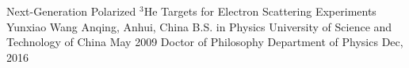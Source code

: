 \documentclass[pdftex,letterpaper,12pt]{report}
\begin{document}
	

\thesistitle
{Next-Generation Polarized $^3$He Targets for Electron Scattering Experiments}                                                %
{Yunxiao Wang}                                               %
{Anqing, Anhui, China}                               %
{B.S. in Physics University of Science and Technology of China May 2009} %
{Doctor of Philosophy}                                 %
{Department of Physics}                                %
{Dec, 2016}  



















% 
	
\end{document}

